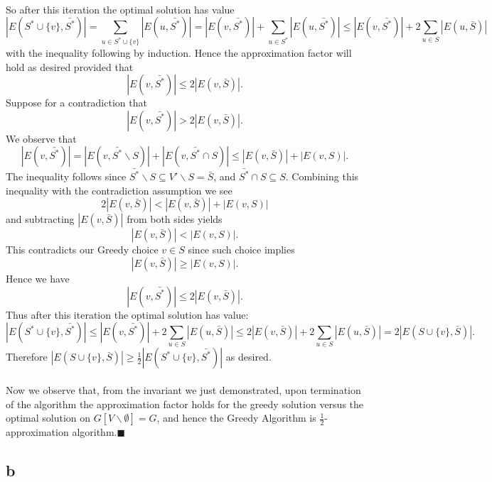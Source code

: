 \documentclass[letterpaper,12pt,oneside,onecolumn]{article}
\begin{document}
\paragraph{}
So after this iteration the optimal solution has value
$$|E(S^* \cup \{v\}, \bar{S^*})| =  \sum_{u \in S^* \cup \{v\}} |E(u, \bar{S^*})| = |E(v,\bar{S^*})| + \sum_{u \in S^*} |E(u, \bar{S^*})| \leq |E(v,\bar{S^*})| + 2\sum_{u \in S} |E(u, \bar{S})|$$
with the inequality following by induction. Hence the approximation factor will hold as desired provided that
$$|E(v,\bar{S^*})| \leq 2|E(v,\bar{S})|.$$
Suppose for a contradiction that
$$|E(v,\bar{S^*})| > 2|E(v,\bar{S})|.$$
We observe that
$$|E(v, \bar{S^*})| = |E(v,\bar{S^*}\backslash S)| + |E(v, \bar{S^*}\cap S)| \leq  |E(v, \bar{S})| + |E(v, S)|.$$
The inequality follows since $\bar{S^*}\backslash S \subseteq V' \backslash S = \bar{S}$, and $\bar{S^*} \cap S \subseteq S$. Combining this inequality with the contradiction assumption we see
$$2|E(v,\bar{S})| <|E(v, \bar{S})| + |E(v, S)|$$
and subtracting $|E(v, \bar{S})|$ from both sides yields
$$ |E(v,\bar{S})| < |E(v,S)|.$$
This contradicts our Greedy choice $v \in S$ since such choice implies
$$ |E(v,\bar{S})| \geq |E(v,S)|.$$
Hence we have
$$|E(v,\bar{S^*})| \leq 2|E(v,\bar{S})|.$$
Thus after this iteration the optimal solution has value:
$$|E(S^* \cup \{v\}, \bar{S^*})|  \leq |E(v,\bar{S^*})| + 2\sum_{u \in S} |E(u, \bar{S})| \leq 2|E(v,\bar{S})| + 2\sum_{u \in S} |E(u, \bar{S})| = 2 |E(S \cup \{v\}, \bar{S})|.$$
Therefore $|E(S \cup \{v\}, \bar{S})| \geq \frac{1}{2} |E(S^* \cup \{v\}, \bar{S^*})|$ as desired. 
\paragraph{}
Now we observe that, from the invariant we just demonstrated, upon termination of the algorithm the approximation factor holds for the greedy solution versus the optimal solution on $G[V \backslash \emptyset] = G$, and hence the Greedy Algorithm is $\frac{1}{2}$-approximation algorithm.$\blacksquare$
\subsection{b}
\end{document}
